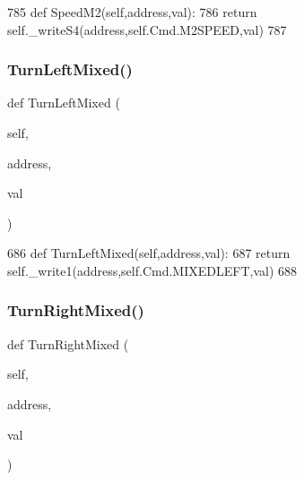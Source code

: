 \begin{DoxyCode}
785     \textcolor{keyword}{def }SpeedM2(self,address,val):
786         \textcolor{keywordflow}{return} self.\_writeS4(address,self.Cmd.M2SPEED,val)
787 
\end{DoxyCode}
\mbox{\label{classtoxic__hardware_1_1roboclaw__3_1_1Roboclaw_aafa3ee25f590d5f4b0259f38b32bd626}} 
\subsubsection{\texorpdfstring{Turn\+Left\+Mixed()}{TurnLeftMixed()}}
{\footnotesize\ttfamily def Turn\+Left\+Mixed (\begin{DoxyParamCaption}\item[{}]{self,  }\item[{}]{address,  }\item[{}]{val }\end{DoxyParamCaption})}


\begin{DoxyCode}
686     \textcolor{keyword}{def }TurnLeftMixed(self,address,val):
687         \textcolor{keywordflow}{return} self.\_write1(address,self.Cmd.MIXEDLEFT,val)
688 
\end{DoxyCode}
\mbox{\label{classtoxic__hardware_1_1roboclaw__3_1_1Roboclaw_ad05d76efd4822a8f8ee8a558820083c8}} 
\subsubsection{\texorpdfstring{Turn\+Right\+Mixed()}{TurnRightMixed()}}
{\footnotesize\ttfamily def Turn\+Right\+Mixed (\begin{DoxyParamCaption}\item[{}]{self,  }\item[{}]{address,  }\item[{}]{val }\end{DoxyParamCaption})}


